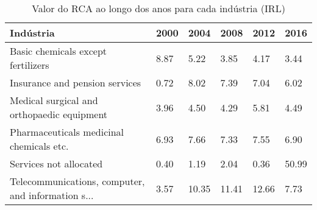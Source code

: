 \begin{table}
\centering
\caption{Valor do RCA ao longo dos anos para cada indústria (IRL)}
\label{tab:ex3-tempo-IRL}
\begin{tabular}{p{6cm}p{1.5cm}p{1.5cm}p{1.5cm}p{1.5cm}p{1.5cm}}
\toprule
                                         Indústria & 2000 &  2004 &  2008 &  2012 &  2016 \\
\midrule
                Basic chemicals except fertilizers & 8.87 &  5.22 &  3.85 &  4.17 &  3.44 \\
                    Insurance and pension services & 0.72 &  8.02 &  7.39 &  7.04 &  6.02 \\
        Medical surgical and orthopaedic equipment & 3.96 &  4.50 &  4.29 &  5.81 &  4.49 \\
          Pharmaceuticals medicinal chemicals etc. & 6.93 &  7.66 &  7.33 &  7.55 &  6.90 \\
                            Services not allocated & 0.40 &  1.19 &  2.04 &  0.36 & 50.99 \\
Telecommunications, computer, and information s... & 3.57 & 10.35 & 11.41 & 12.66 &  7.73 \\
\bottomrule
\end{tabular}
\end{table}
